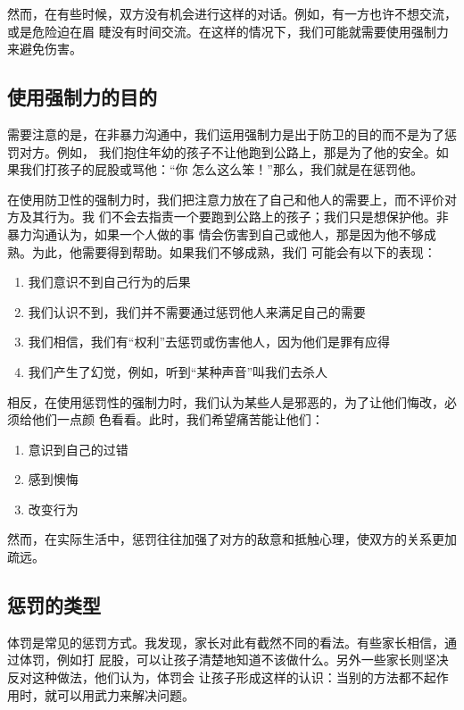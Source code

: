\documentclass{ctexart}
\begin{document}
然而，在有些时候，双方没有机会进行这样的对话。例如，有一方也许不想交流，或是危险迫在眉
睫没有时间交流。在这样的情况下，我们可能就需要使用强制力来避免伤害。

\subsection{使用强制力的目的}

需要注意的是，在非暴力沟通中，我们运用强制力是出于防卫的目的而不是为了惩罚对方。例如，
我们抱住年幼的孩子不让他跑到公路上，那是为了他的安全。如果我们打孩子的屁股或骂他：``你
怎么这么笨！''那么，我们就是在惩罚他。

在使用防卫性的强制力时，我们把注意力放在了自己和他人的需要上，而不评价对方及其行为。我
们不会去指责一个要跑到公路上的孩子；我们只是想保护他。非暴力沟通认为，如果一个人做的事
情会伤害到自己或他人，那是因为他不够成熟。为此，他需要得到帮助。如果我们不够成熟，我们
可能会有以下的表现：

\begin{enumerate}[label=（\arabic*）]
	\item 我们意识不到自己行为的后果
	\item 我们认识不到，我们并不需要通过惩罚他人来满足自己的需要
	\item 我们相信，我们有``权利''去惩罚或伤害他人，因为他们是罪有应得
	\item 我们产生了幻觉，例如，听到``某种声音''叫我们去杀人
\end{enumerate}

相反，在使用惩罚性的强制力时，我们认为某些人是邪恶的，为了让他们悔改，必须给他们一点颜
色看看。此时，我们希望痛苦能让他们：

\begin{enumerate}[label=（\arabic*）]
	\item 意识到自己的过错
	\item 感到懊悔
	\item 改变行为
\end{enumerate}

然而，在实际生活中，惩罚往往加强了对方的敌意和抵触心理，使双方的关系更加疏远。


\subsection{惩罚的类型}

体罚是常见的惩罚方式。我发现，家长对此有截然不同的看法。有些家长相信，通过体罚，例如打
屁股，可以让孩子清楚地知道不该做什么。另外一些家长则坚决反对这种做法，他们认为，体罚会
让孩子形成这样的认识：当别的方法都不起作用时，就可以用武力来解决问题。
\end{document}
